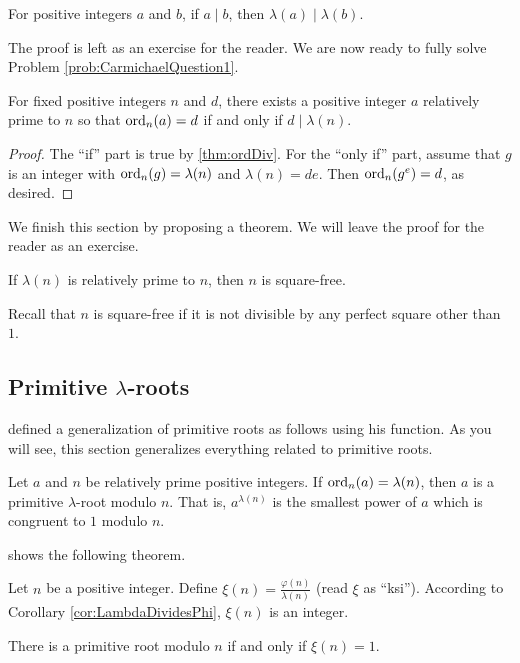 \begin{theorem}
	For positive integers $a$ and $b$, if $a \mid b$, then $\lambda(a) \mid \lambda(b)$.
\end{theorem}
The proof is left as an exercise for the reader. We are now ready to fully solve Problem \ref{prob:CarmichaelQuestion1}.
\begin{theorem}
	For fixed positive integers $n$ and $d$, there exists a positive integer $a$  relatively prime to $n$ so that $\operatorname{ord}_n(a)=d$ if and only if $d \mid \lambda(n)$.
\end{theorem}

\begin{proof}
	The ``if'' part is true by \autoref{thm:ordDiv}. For the ``only if'' part, assume that $g$ is an integer with $\operatorname{ord}_n(g)=\lambda(n)$ and $\lambda(n)=de$. Then $\operatorname{ord}_n(g^e)=d$, as desired.
\end{proof}

We finish this section by proposing a theorem. We will leave the proof for the reader as an exercise.
	\begin{theorem}
		If $\lambda(n)$ is relatively prime to $n$, then $n$ is square-free.
	\end{theorem}
Recall that $n$ is square-free if it is not divisible by any perfect square other than $1$.

\subsection{Primitive \texorpdfstring{$\lambda$}{Lambda}-roots}
\textcite[Page $232-233$, Result II]{carmichael_1910} defined a generalization of primitive roots as follows using his function. As you will see, this section generalizes everything related to primitive roots.
\begin{definition}
	Let $a$ and $n$ be relatively prime positive integers. If $\operatorname{ord}_n(a)=\lambda(n)$, then $a$ is a primitive $\lambda$-root modulo $n$. That is, $a^{\lambda(n)}$ is the smallest power of $a$ which is congruent to $1$ modulo $n$.
\end{definition}
\textcite{cameron_preece_2014} shows the following theorem.
\begin{definition}
	Let $n$ be a positive integer. Define $\xi(n) = \frac{\varphi(n)}{\lambda(n)}$ (read $\xi$ as ``ksi''). According to Corollary \ref{cor:LambdaDividesPhi}, $\xi(n)$ is an integer.
\end{definition}

\begin{proposition}
 There is a primitive root modulo $n$ if and only if $\xi(n)=1$.
\end{proposition}

